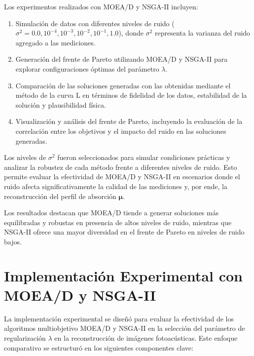 Los experimentos realizados con MOEA/D y NSGA-II incluyen:
\begin{enumerate}
    \item Simulación de datos con diferentes niveles de ruido (\( \sigma^2 = 0.0, 10^{-4}, 10^{-3}, 10^{-2}, 10^{-1}, 1.0 \)), donde \( \sigma^2 \) representa la varianza del ruido agregado a las mediciones.
    \item Generación del frente de Pareto utilizando MOEA/D y NSGA-II para explorar configuraciones óptimas del parámetro \( \lambda \).
    \item Comparación de las soluciones generadas con las obtenidas mediante el método de la curva L en términos de fidelidad de los datos, estabilidad de la solución y plausibilidad física.
    \item Visualización y análisis del frente de Pareto, incluyendo la evaluación de la correlación entre los objetivos y el impacto del ruido en las soluciones generadas.
\end{enumerate}

Los niveles de \( \sigma^2 \) fueron seleccionados para simular condiciones prácticas y analizar la robustez de cada método frente a diferentes niveles de ruido. Esto permite evaluar la efectividad de MOEA/D y NSGA-II en escenarios donde el ruido afecta significativamente la calidad de las mediciones y, por ende, la reconstrucción del perfil de absorción \( \mathbf{\mu} \).

Los resultados destacan que MOEA/D tiende a generar soluciones más equilibradas y robustas en presencia de altos niveles de ruido, mientras que NSGA-II ofrece una mayor diversidad en el frente de Pareto en niveles de ruido bajos.

\section{Implementación Experimental con MOEA/D y NSGA-II} \label{sec:method:implementation}

La implementación experimental se diseñó para evaluar la efectividad de los algoritmos multiobjetivo MOEA/D y NSGA-II en la selección del parámetro de regularización \( \lambda \) en la reconstrucción de imágenes fotoacústicas. Este enfoque comparativo se estructuró en los siguientes componentes clave:


